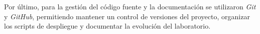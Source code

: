 Por último, para la gestión del código fuente y la documentación se utilizaron \textit{Git} y \textit{GitHub}, permitiendo mantener un control de versiones del proyecto, organizar los scripts de despliegue y documentar la evolución del laboratorio.





